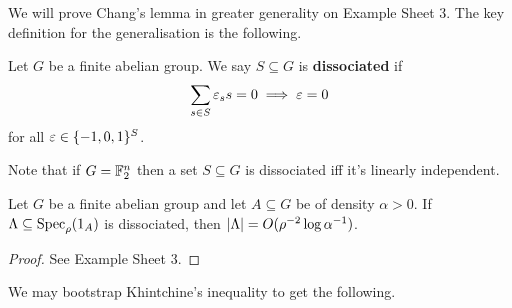 \documentclass{article}
\begin{document}
We will prove Chang's lemma in greater generality on Example Sheet 3. The key definition for the generalisation is the following.

\begin{dfn}
  Let $G$ be a finite abelian group. We say $S \subseteq G$ is {\bf dissociated} if
  $$\sum_{s \in S} \varepsilon_s s = 0 \implies \varepsilon = 0$$
  for all $\varepsilon \in \{-1, 0, 1\}^S$.
\end{dfn}

Note that if $G = \mathbb F_2^n$ then a set $S \subseteq G$ is dissociated iff it's linearly independent.

\newlec

\begin{thm}
  Let $G$  be a finite abelian group and let $A \subseteq G$ be of density $\alpha > 0$. If $\Lambda \subseteq \operatorname{Spec}_\rho(1_A)$ is dissociated, then $\left\lvert \Lambda\right\rvert = O(\rho^{-2}\log\alpha^{-1})$.
\end{thm}
\begin{proof}
  See Example Sheet 3.
\end{proof}

We may bootstrap Khintchine's inequality to get the following.
\end{document}

